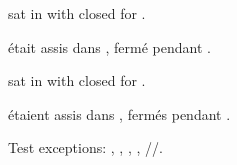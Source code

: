 \documentclass{article}
\begin{document}

 sat in  with  closed for .

 était assis dans ,  fermé pendant .

 sat in  with  closed for .

 étaient assis dans , 
fermés pendant .

Test exceptions:
, , , ,
//.

\printunsrtglossaries
\end{document}
